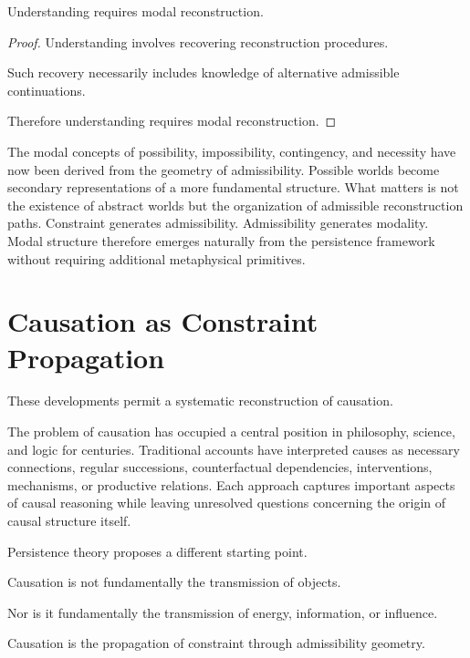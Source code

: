 \documentclass[12pt,oneside]{article}
\theoremstyle{definition}
\begin{document}
\begin{corollary}

Understanding requires modal reconstruction.

\end{corollary}

\begin{proof}

Understanding involves recovering reconstruction procedures.

Such recovery necessarily includes knowledge of alternative admissible continuations.

Therefore understanding requires modal reconstruction.

\end{proof}

The modal concepts of possibility, impossibility, contingency, and necessity have now been derived from the geometry of admissibility. Possible worlds become secondary representations of a more fundamental structure. What matters is not the existence of abstract worlds but the organization of admissible reconstruction paths. Constraint generates admissibility. Admissibility generates modality. Modal structure therefore emerges naturally from the persistence framework without requiring additional metaphysical primitives.

\section{Causation as Constraint Propagation}

These developments permit a systematic reconstruction of causation.

The problem of causation has occupied a central position in philosophy, science, and logic for centuries. Traditional accounts have interpreted causes as necessary connections, regular successions, counterfactual dependencies, interventions, mechanisms, or productive relations. Each approach captures important aspects of causal reasoning while leaving unresolved questions concerning the origin of causal structure itself.

Persistence theory proposes a different starting point.

Causation is not fundamentally the transmission of objects.

Nor is it fundamentally the transmission of energy, information, or influence.

Causation is the propagation of constraint through admissibility geometry.
\end{document}

